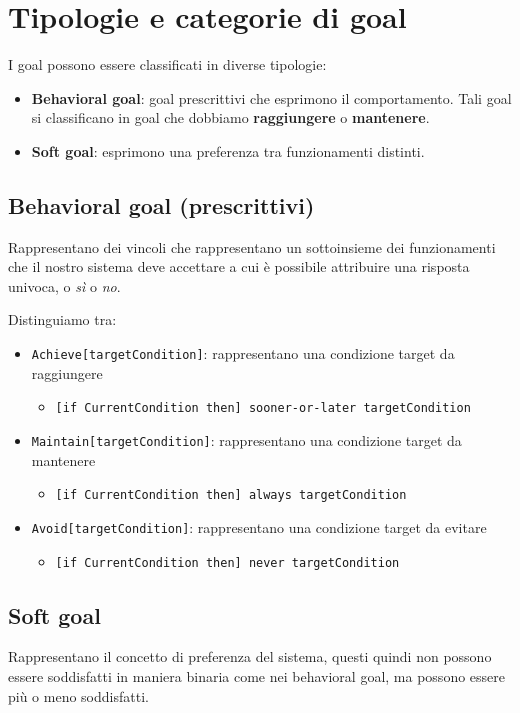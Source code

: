 \section{Tipologie e categorie di goal}
I goal possono essere classificati in diverse tipologie: 
\begin{itemize}
    \item \textbf{Behavioral goal}: goal prescrittivi che esprimono il comportamento.
    Tali goal si classificano in goal che dobbiamo \textbf{raggiungere} o \textbf{mantenere}.
    \item \textbf{Soft goal}: esprimono una preferenza tra funzionamenti distinti.
\end{itemize}
\subsection{Behavioral goal (prescrittivi)}
Rappresentano dei vincoli che rappresentano un sottoinsieme dei funzionamenti che il nostro 
sistema deve accettare a cui è possibile attribuire una risposta univoca, o \textit{sì}
o \textit{no}.

Distinguiamo tra:
\begin{itemize}
    \item \texttt{Achieve[targetCondition]}: rappresentano una condizione target da raggiungere
    \begin{itemize}
        \item \texttt{[if CurrentCondition then] sooner-or-later targetCondition}
    \end{itemize}
    \item \texttt{Maintain[targetCondition]}: rappresentano una condizione target da mantenere
    \begin{itemize}
        \item \texttt{[if CurrentCondition then] always targetCondition}
    \end{itemize}
    \item \texttt{Avoid[targetCondition]}: rappresentano una condizione target da evitare
    \begin{itemize}
        \item \texttt{[if CurrentCondition then] never targetCondition}
    \end{itemize}
\end{itemize}
\subsection{Soft goal}
Rappresentano il concetto di preferenza del sistema, questi quindi non possono essere 
soddisfatti in maniera binaria come nei behavioral goal, ma possono essere più o meno
soddisfatti.

